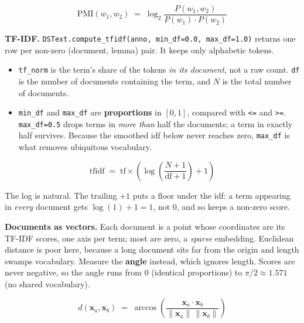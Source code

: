 \documentclass[11pt, a4paper]{article}
\newcommand{\code}[1]{\texttt{#1}}
\begin{document}
\begin{equation*}
\text{PMI}(w_1, w_2) \;=\; \log_2 \frac{P(w_1, w_2)}{P(w_1) \cdot P(w_2)}
\end{equation*}

\smallskip

\textbf{TF-IDF.}
\code{DSText.compute\_tfidf(anno, min\_df=0.0, max\_df=1.0)} returns one row per non-zero
(document, lemma) pair. It keeps only alphabetic tokens.

\begin{itemize}
  \item \code{tf\_norm} is the term's share of the tokens \textit{in its document}, not a raw
        count. \code{df} is the number of documents containing the term, and $N$ is the total
        number of documents.
  \item \code{min\_df} and \code{max\_df} are \textbf{proportions} in $[0, 1]$, compared with
        \code{<=} and \code{>=}. \code{max\_df=0.5} drops terms in \textit{more than} half the
        documents; a term in exactly half survives. Because the smoothed idf below never
        reaches zero, \code{max\_df} is what removes ubiquitous vocabulary.
\end{itemize}

\begin{equation*}
\text{tfidf} \;=\; \text{tf} \times \left( \log\!\left( \frac{N + 1}{\text{df} + 1} \right) + 1 \right)
\end{equation*}

The log is natural. The trailing $+1$ puts a floor under the idf: a term appearing in
\textit{every} document gets $\log(1) + 1 = 1$, not $0$, and so keeps a non-zero score.

\smallskip

\textbf{Documents as vectors.}
Each document is a point whose coordinates are its TF-IDF scores, one axis per term; most are
zero, a \textit{sparse} embedding. Euclidean distance is poor here, because a long document
sits far from the origin and length swamps vocabulary. Measure the \textbf{angle} instead,
which ignores length. Scores are never negative, so the angle runs from $0$ (identical
proportions) to $\pi/2 \approx 1.571$ (no shared vocabulary).

\begin{equation*}
d(\mathbf{x}_a, \mathbf{x}_b) \;=\; \arccos\!\left( \frac{\mathbf{x}_a \cdot \mathbf{x}_b}{\lVert \mathbf{x}_a \rVert \, \lVert \mathbf{x}_b \rVert} \right)
\end{equation*}
\end{document}
